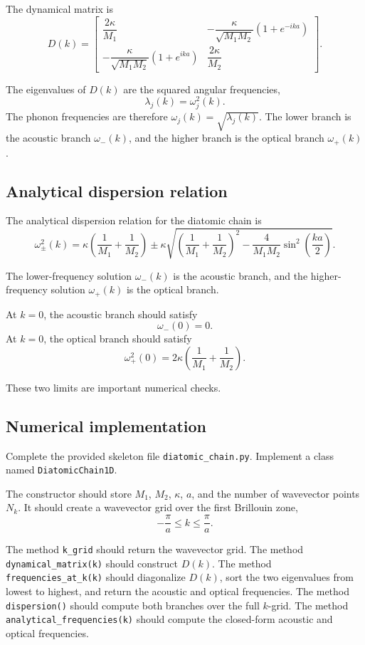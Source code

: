 The dynamical matrix is
\[
D(k)=
\begin{bmatrix}
\dfrac{2\kappa}{M_1}
&
-\dfrac{\kappa}{\sqrt{M_1M_2}}\left(1+e^{-ika}\right)
\\[1em]
-\dfrac{\kappa}{\sqrt{M_1M_2}}\left(1+e^{ika}\right)
&
\dfrac{2\kappa}{M_2}
\end{bmatrix}.
\]

The eigenvalues of \(D(k)\) are the squared angular frequencies,
\[
\lambda_j(k)=\omega_j^2(k).
\]
The phonon frequencies are therefore \(\omega_j(k)=\sqrt{\lambda_j(k)}\). The lower branch is the acoustic branch \(\omega_-(k)\), and the higher branch is the optical branch \(\omega_+(k)\).

\subsection{Analytical dispersion relation}

The analytical dispersion relation for the diatomic chain is
\[
\omega_{\pm}^2(k)
=
\kappa
\left(
\frac{1}{M_1}
+
\frac{1}{M_2}
\right)
\pm
\kappa
\sqrt{
\left(
\frac{1}{M_1}
+
\frac{1}{M_2}
\right)^2
-
\frac{4}{M_1M_2}
\sin^2\left(\frac{ka}{2}\right)
}.
\]

The lower-frequency solution \(\omega_-(k)\) is the acoustic branch, and the higher-frequency solution \(\omega_+(k)\) is the optical branch.

At \(k=0\), the acoustic branch should satisfy
\[
\omega_-(0)=0.
\]
At \(k=0\), the optical branch should satisfy
\[
\omega_+^2(0)
=
2\kappa
\left(
\frac{1}{M_1}
+
\frac{1}{M_2}
\right).
\]

These two limits are important numerical checks.

\subsection{Numerical implementation}

Complete the provided skeleton file \texttt{diatomic\_chain.py}. Implement a class named \texttt{DiatomicChain1D}.

The constructor should store \(M_1\), \(M_2\), \(\kappa\), \(a\), and the number of wavevector points \(N_k\). It should create a wavevector grid over the first Brillouin zone,
\[
-\frac{\pi}{a}\le k\le\frac{\pi}{a}.
\]

The method \texttt{k\_grid} should return the wavevector grid. The method \texttt{dynamical\_matrix(k)} should construct \(D(k)\). The method \texttt{frequencies\_at\_k(k)} should diagonalize \(D(k)\), sort the two eigenvalues from lowest to highest, and return the acoustic and optical frequencies. The method \texttt{dispersion()} should compute both branches over the full \(k\)-grid. The method \texttt{analytical\_frequencies(k)} should compute the closed-form acoustic and optical frequencies.

